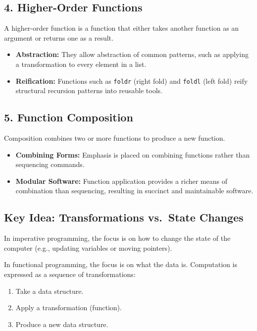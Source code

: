 \documentclass[12pt]{article}
\begin{document}
\subsection{4. Higher-Order Functions}

A higher-order function is a function that either takes another function as an argument or returns one as a result.

\begin{itemize}
  \item \textbf{Abstraction:} They allow abstraction of common patterns, such as applying a transformation to every element in a list.
  \item \textbf{Reification:} Functions such as \texttt{foldr} (right fold) and \texttt{foldl} (left fold) reify structural recursion patterns into reusable tools.
\end{itemize}

\subsection{5. Function Composition}

Composition combines two or more functions to produce a new function.

\begin{itemize}
  \item \textbf{Combining Forms:} Emphasis is placed on combining functions rather than sequencing commands.
  \item \textbf{Modular Software:} Function application provides a richer means of combination than sequencing, resulting in succinct and maintainable software.
\end{itemize}

\subsection{Key Idea: Transformations vs.\ State Changes}

In imperative programming, the focus is on how to change the state of the computer (e.g., updating variables or moving pointers).

In functional programming, the focus is on what the data is. Computation is expressed as a sequence of transformations:

\begin{enumerate}
  \item Take a data structure.
  \item Apply a transformation (function).
  \item Produce a new data structure.
\end{enumerate}
\end{document}
